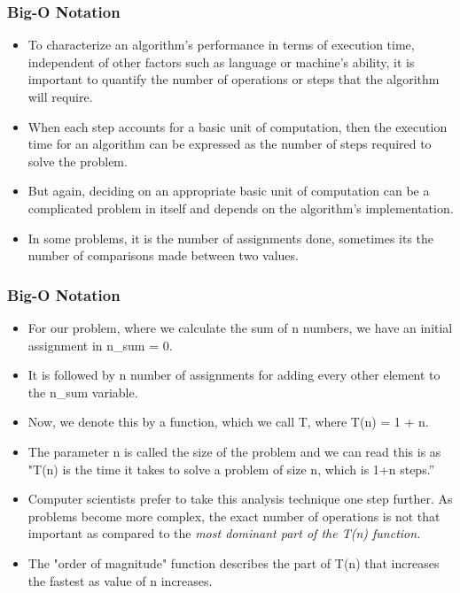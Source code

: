 \documentclass{beamer}
\begin{document}
\begin{frame}
\frametitle{Big-O Notation}
\begin{itemize}
\item To characterize an algorithm's performance in terms of execution time, independent of other factors  such as language or machine's ability, it is important to quantify the number of operations or
steps that the algorithm will require.
\item When each step accounts for a basic unit of computation, then the execution time for an algorithm can be expressed as the number of steps required to solve the problem. 
\item But again, deciding on an appropriate basic unit of computation can be a complicated problem in itself and depends on the algorithm's implementation.
\item In some problems, it is the number of assignments done, sometimes its the number of comparisons made between two values.

\end{itemize}
\end{frame}

\begin{frame}
\frametitle{Big-O Notation}
\begin{itemize}
\item For our problem, where we calculate the sum of n numbers, we have an initial assignment in n\_sum = 0.
\item It is followed by n number of assignments for adding every other element to the n\_sum variable.
\item Now, we denote this by a function, which we call T, where T(n) = 1 + n.
\item The parameter n is called the size of the problem and we can read this is as "T(n) is the time it takes to solve a problem of size n, which is 1+n steps.”
\item Computer scientists prefer to take this analysis technique one step further. As problems become more complex, the exact number of operations is not that important as compared to the \textit{most dominant part of the T(n) function.}
\item The "order of magnitude" function describes the part of T(n) that increases the fastest as value of n increases. 
\end{itemize}
\end{frame}
\end{document}
